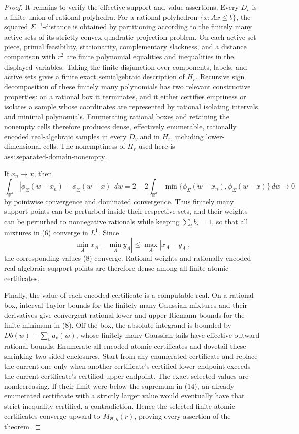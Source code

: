 \documentclass{article}
\begin{document}
\begin{proof}
It remains to verify the effective support and value assertions.  Every
\(D_v\) is a finite union of rational polyhedra.  For a rational polyhedron
\(\{x:Ax\leq b\}\), the squared \(\Sigma^{-1}\)-distance is obtained by
partitioning according to the finitely many active sets of its strictly
convex quadratic projection problem.  On each active-set piece, primal
feasibility, stationarity, complementary slackness, and a distance
comparison with \(r^2\) are finite polynomial equalities and inequalities
in the displayed variables.  Taking the finite disjunction over components,
labels, and active sets gives a finite exact semialgebraic description of
\(H_r\).  Recursive sign decomposition of these finitely many polynomials
has two relevant constructive properties: on a rational box it terminates,
and it either certifies emptiness or isolates a sample whose coordinates
are represented by rational isolating intervals and minimal polynomials.
Enumerating rational boxes and retaining the nonempty cells therefore
produces dense, effectively enumerable, rationally encoded real-algebraic
samples in every \(D_v\) and in \(H_r\), including lower-dimensional cells.
The nonemptiness of \(H_r\) used here is
\(\mathrm{ass:separated\mbox{-}domain\mbox{-}nonempty}\).

If \(x_n\to x\), then
\[
 \int_{\mathbb R^d}
 |\phi_\Sigma(w-x_n)-\phi_\Sigma(w-x)|\,dw
 =
 2-2\int_{\mathbb R^d}
 \min\{\phi_\Sigma(w-x_n),\phi_\Sigma(w-x)\}\,dw
 \longrightarrow0
\tag{15}
\]
by pointwise convergence and dominated convergence.  Thus finitely many
support points can be perturbed inside their respective sets, and their
weights can be perturbed to nonnegative rationals while keeping
\(\sum_i b_i=1\), so that all mixtures in (6) converge in \(L^1\).  Since
\[
 \left|\min_A x_A-\min_A y_A\right|
 \leq\max_A|x_A-y_A|,
\tag{16}
\]
the corresponding values (8) converge.  Rational weights and rationally
encoded real-algebraic support points are therefore dense among all finite
atomic certificates.

Finally, the value of each encoded certificate is a computable real.  On a
rational box, interval Taylor bounds for the finitely many Gaussian
mixtures and their derivatives give convergent rational lower and upper
Riemann bounds for the finite minimum in (8).  Off the box, the absolute
integrand is bounded by
\(D b(w)+\sum_v a_v(w)\), whose finitely many Gaussian tails have effective
outward rational bounds.  Enumerate all encoded atomic certificates and
dovetail these shrinking two-sided enclosures.  Start from any enumerated
certificate and replace the current one only when another certificate's
certified lower endpoint exceeds the current certificate's certified upper
endpoint.  The exact selected values are nondecreasing.  If their limit
were below the supremum in (14), an already enumerated certificate with a
strictly larger value would eventually have that strict inequality
certified, a contradiction.  Hence the selected finite atomic certificates
converge upward to \(M_{\mathfrak G,\eta}(r)\), proving every assertion of
the theorem.
\end{proof}
\end{document}
